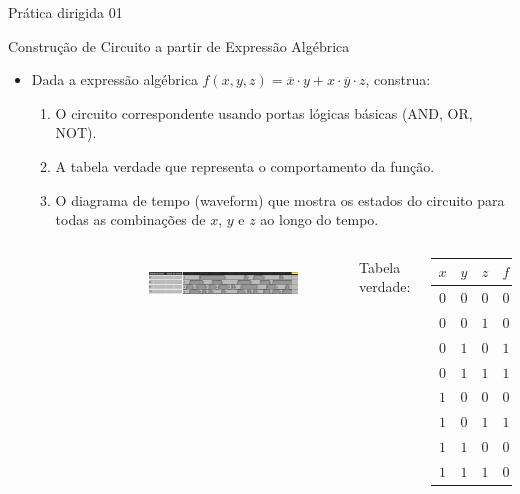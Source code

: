 \begin{frame}{Prática dirigida 01}
	\par Construção de Circuito a partir de Expressão Algébrica
	\begin{itemize}
		\item Dada a expressão algébrica \(f(x, y, z) = \overline{x} \cdot y + x \cdot \overline{y} \cdot z\), construa: %
		\begin{enumerate}
			\item O circuito correspondente usando portas lógicas básicas (AND, OR, NOT).
			\item A tabela verdade que representa o comportamento da função.
			\item O diagrama de tempo (waveform) que mostra os estados do circuito para todas as combinações de \(x\), \(y\) e \(z\) ao longo do tempo.
		\end{enumerate}
	\end{itemize}
	\pause
	\begin{columns}
			\begin{figure}
				\centering
				
				\label{fig:exe14}
			\end{figure}
			\begin{figure}
				\centering
				\includegraphics[width=\linewidth]{images/waveform03}
				\label{fig:waveform03}
			\end{figure}
			\par Tabela verdade:\\
			\begin{tabular}{ccc|c}
				$x$&$y$&$z$&$f$\\
				\hline
				$0$&$0$&$0$&$0$\\
				$0$&$0$&$1$&$0$\\
				$0$&$1$&$0$&$1$\\
				$0$&$1$&$1$&$1$\\
				$1$&$0$&$0$&$0$\\
				$1$&$0$&$1$&$1$\\
				$1$&$1$&$0$&$0$\\
				$1$&$1$&$1$&$0$\\
			\end{tabular}
	\end{columns}
\end{frame}

